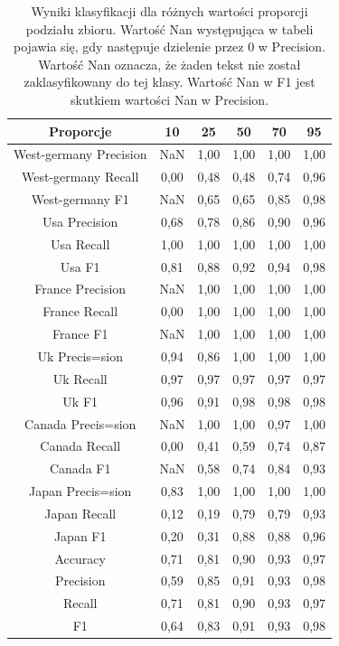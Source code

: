 \documentclass{classrep}
\begin{document}
\newpage
\begin{table}[h!]
\caption{Wyniki klasyfikacji dla różnych wartości proporcji podziału zbioru. Wartość Nan występująca w tabeli pojawia się, gdy następuje dzielenie przez 0 w Precision. Wartość Nan oznacza, że żaden tekst nie został zaklasyfikowany do tej klasy. Wartość Nan w F1 jest skutkiem wartości Nan w Precision. }
\centering
\vspace{0.1cm}
 \begin{tabular}{c c c c c c}

    \textbf{Proporcje} & \textbf{10}   & \textbf{25}  & \textbf{50}  & \textbf{70}  & \textbf{95}\\

\hline
West-germany Precision 	& NaN & 1,00 & 1,00 & 1,00 & 1,00\\
West-germany Recall 		& 0,00 & 0,48 & 0,48 & 0,74 & 0,96\\
West-germany F1		& NaN & 0,65 & 0,65 & 0,85 & 0,98\\
\hline
Usa Precision 			& 0,68 & 0,78 & 0,86 & 0,90 & 0,96\\
Usa Recall				& 1,00 & 1,00 & 1,00 & 1,00 & 1,00\\
Usa F1			 	& 0,81 & 0,88 & 0,92 & 0,94 & 0,98\\
\hline
France Precision 		& NaN & 1,00 & 1,00 & 1,00 & 1,00\\
France Recall 			& 0,00 & 1,00 & 1,00 & 1,00 & 1,00\\
France F1 				& NaN & 1,00 & 1,00 & 1,00 & 1,00\\
\hline
Uk Precis=sion 			& 0,94 & 0,86 & 1,00 & 1,00 & 1,00\\
Uk Recall 				& 0,97 & 0,97 & 0,97 & 0,97 & 0,97\\
Uk F1 				& 0,96 & 0,91 & 0,98 & 0,98 & 0,98\\
\hline
Canada Precis=sion		& NaN & 1,00 & 1,00 & 0,97 & 1,00\\
Canada Recall 			& 0,00 & 0,41 & 0,59 & 0,74 & 0,87\\
Canada F1 			& NaN & 0,58 & 0,74 & 0,84 & 0,93\\
\hline
Japan Precis=sion 		& 0,83 & 1,00 & 1,00 & 1,00 & 1,00\\
Japan Recall 			& 0,12 & 0,19 & 0,79 & 0,79 & 0,93\\
Japan F1 				& 0,20 & 0,31 & 0,88 & 0,88 & 0,96\\
\hline
Accuracy 				& 0,71 & 0,81 & 0,90 & 0,93 & 0,97\\
Precision 				& 0,59 & 0,85 & 0,91 & 0,93 & 0,98\\
Recall 				& 0,71 & 0,81 & 0,90 & 0,93 & 0,97\\
F1 					& 0,64 & 0,83 & 0,91 & 0,93 & 0,98\\

\end {tabular}
\label {Wyniki klasyfikacji dla różnych wartości proporcji podziału zbioru.}
\end{table}
\end{document}
